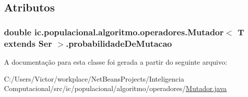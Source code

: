 \subsection{Atributos}
\hypertarget{classic_1_1populacional_1_1algoritmo_1_1operadores_1_1_mutador_3_01_t_01extends_01_ser_01_4_a1ef75bbeff32bd2bf0b56c8b2ad86c60}{
\subsubsection[{probabilidade\-De\-Mutacao}]{\setlength{\rightskip}{0pt plus 5cm}double ic.\-populacional.\-algoritmo.\-operadores.\-Mutador$<$ T extends Ser $>$.probabilidade\-De\-Mutacao\hspace{0.3cm}{\ttfamily [protected]}}}\label{classic_1_1populacional_1_1algoritmo_1_1operadores_1_1_mutador_3_01_t_01extends_01_ser_01_4_a1ef75bbeff32bd2bf0b56c8b2ad86c60}


A documentação para esta classe foi gerada a partir do seguinte arquivo\-:\begin{DoxyCompactItemize}
\item 
C\-:/\-Users/\-Victor/workplace/\-Net\-Beans\-Projects/\-Inteligencia Computacional/src/ic/populacional/algoritmo/operadores/\hyperlink{_mutador_8java}{Mutador.\-java}\end{DoxyCompactItemize}
